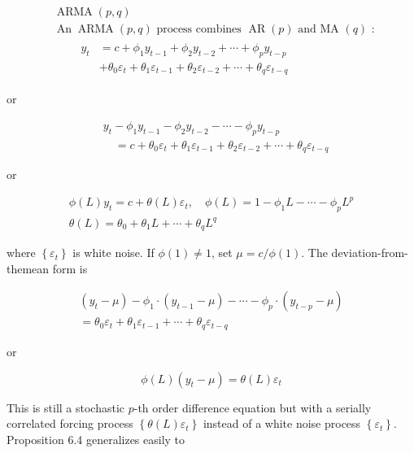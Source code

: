 \documentclass[10pt]{article}
\begin{document}
$$
\begin{aligned}
& \operatorname{ARMA}(p, q) \\
& \operatorname{An} \operatorname{ARMA}(p, q) \text { process combines } \operatorname{AR}(p) \text { and MA }(q) \text { : } \\
& \qquad \begin{aligned}
y_{t} & =c+\phi_{1} y_{t-1}+\phi_{2} y_{t-2}+\cdots+\phi_{p} y_{t-p} \\
& +\theta_{0} \varepsilon_{t}+\theta_{1} \varepsilon_{t-1}+\theta_{2} \varepsilon_{t-2}+\cdots+\theta_{q} \varepsilon_{t-q}
\end{aligned}
\end{aligned}
$$

or

$$
\begin{aligned}
& y_{t}-\phi_{1} y_{t-1}-\phi_{2} y_{t-2}-\cdots-\phi_{p} y_{t-p} \\
& \quad=c+\theta_{0} \varepsilon_{t}+\theta_{1} \varepsilon_{t-1}+\theta_{2} \varepsilon_{t-2}+\cdots+\theta_{q} \varepsilon_{t-q}
\end{aligned}
$$

or


\begin{gather*}
\phi(L) y_{t}=c+\theta(L) \varepsilon_{t}, \quad \phi(L)=1-\phi_{1} L-\cdots-\phi_{p} L^{p} \\
\theta(L)=\theta_{0}+\theta_{1} L+\cdots+\theta_{q} L^{q} \tag{6.2.9}
\end{gather*}


where $\left\{\varepsilon_{t}\right\}$ is white noise. If $\phi(1) \neq 1$, set $\mu=c / \phi(1)$. The deviation-from-themean form is

$$
\begin{gathered}
\left(y_{t}-\mu\right)-\phi_{1} \cdot\left(y_{t-1}-\mu\right)-\cdots-\phi_{p} \cdot\left(y_{t-p}-\mu\right) \\
=\theta_{0} \varepsilon_{t}+\theta_{1} \varepsilon_{t-1}+\cdots+\theta_{q} \varepsilon_{t-q}
\end{gathered}
$$

or


\begin{equation*}
\phi(L)\left(y_{t}-\mu\right)=\theta(L) \varepsilon_{t} \tag{$\prime$}
\end{equation*}


This is still a stochastic $p$-th order difference equation but with a serially correlated forcing process $\left\{\theta(L) \varepsilon_{t}\right\}$ instead of a white noise process $\left\{\varepsilon_{t}\right\}$. Proposition 6.4 generalizes easily to
\end{document}
